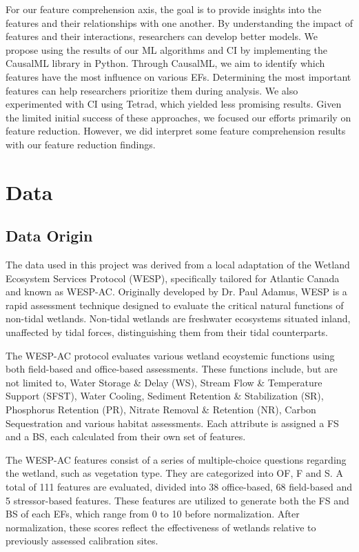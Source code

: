 \documentclass[12pt,letterpaper]{article}
\begin{document}
For our feature comprehension axis, the goal is to provide insights into the features and their relationships with one another. 
By understanding the impact of features and their interactions, researchers can develop better models. 
We propose using the results of our \ac{ML} algorithms and \ac{CI} by implementing the CausalML library in Python. 
Through CausalML, we aim to identify which features have the most influence on various \acp{EF}. 
Determining the most important features can help researchers prioritize them during analysis. 
We also experimented with \ac{CI} using Tetrad, which yielded less promising results. 
Given the limited initial success of these approaches, we focused our efforts primarily on feature reduction. 
However, we did interpret some feature comprehension results with our feature reduction findings.


\section{Data}\label{sec:data}

\subsection{Data Origin}
The data used in this project was derived from a local adaptation of the Wetland Ecosystem Services Protocol (WESP), specifically tailored for Atlantic Canada and known as \ac{WESP-AC}.
Originally developed by Dr. Paul Adamus, WESP is a rapid assessment technique designed to evaluate the critical natural functions of non-tidal wetlands.
Non-tidal wetlands are freshwater ecosystems situated inland, unaffected by tidal forces, distinguishing them from their tidal counterparts.

The \ac{WESP-AC} protocol evaluates various wetland ecoystemic functions using both field-based and office-based assessments.
These functions include, but are not limited to, Water Storage \& Delay (\ac{WS}), Stream Flow \& Temperature Support (\ac{SFST}), Water Cooling, Sediment Retention \& Stabilization (\ac{SR}), Phosphorus Retention (\ac{PR}), Nitrate Removal \& Retention (\ac{NR}), Carbon Sequestration and various habitat assessments.
Each attribute is assigned a \ac{FS} and a \ac{BS}, each calculated from their own set of features.


The \ac{WESP-AC} features consist of a series of multiple-choice questions regarding the wetland, such as vegetation type.
They are categorized into \ac{OF}, \ac{F} and \ac{S}.
A total of 111 features are evaluated, divided into 38 office-based, 68 field-based and 5 stressor-based features.
These features are utilized to generate both the \ac{FS} and \ac{BS} of each \ac{EF}s, which range from 0 to 10 before normalization.
After normalization, these scores reflect the effectiveness of wetlands relative to previously assessed calibration sites.
\end{document}
